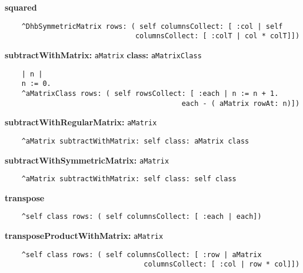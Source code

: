 {\bf squared}
\begin{verbatim}
    ^DhbSymmetricMatrix rows: ( self columnsCollect: [ :col | self 
                               columnsCollect: [ :colT | col * colT]])

\end{verbatim}
{\bf subtractWithMatrix:} {\tt aMatrix} {\bf class:} {\tt aMatrixClass}
\begin{verbatim}
    | n |
    n := 0.
    ^aMatrixClass rows: ( self rowsCollect: [ :each | n := n + 1. 
                                          each - ( aMatrix rowAt: n)])

\end{verbatim}
{\bf subtractWithRegularMatrix:} {\tt aMatrix}
\begin{verbatim}
    ^aMatrix subtractWithMatrix: self class: aMatrix class

\end{verbatim}
{\bf subtractWithSymmetricMatrix:} {\tt aMatrix}
\begin{verbatim}
    ^aMatrix subtractWithMatrix: self class: self class

\end{verbatim}
{\bf transpose}
\begin{verbatim}
    ^self class rows: ( self columnsCollect: [ :each | each])

\end{verbatim}
{\bf transposeProductWithMatrix:} {\tt aMatrix}
\begin{verbatim}
    ^self class rows: ( self columnsCollect: [ :row | aMatrix 
                                 columnsCollect: [ :col | row * col]])

\end{verbatim}

